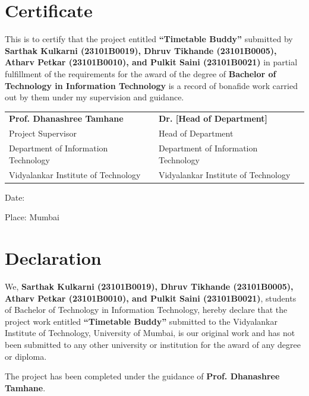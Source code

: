 \documentclass[12pt,a4paper]{report}
\begin{document}
\chapter*{Certificate}
\thispagestyle{empty}

This is to certify that the project entitled \textbf{``Timetable Buddy''} submitted by \textbf{Sarthak Kulkarni (23101B0019), Dhruv Tikhande (23101B0005), Atharv Petkar (23101B0010), and Pulkit Saini (23101B0021)} in partial fulfillment of the requirements for the award of the degree of \textbf{Bachelor of Technology in Information Technology} is a record of bonafide work carried out by them under my supervision and guidance.

\vspace{2cm}

\noindent\begin{tabular}{@{}ll}
    \textbf{Prof. Dhanashree Tamhane} & \textbf{Dr. [Head of Department]} \\
    Project Supervisor & Head of Department \\
    Department of Information Technology & Department of Information Technology \\
    Vidyalankar Institute of Technology & Vidyalankar Institute of Technology \\
\end{tabular}

\vspace{2cm}

\noindent Date: \underline{\hspace{3cm}}

\noindent Place: Mumbai

\chapter*{Declaration}
\thispagestyle{empty}

We, \textbf{Sarthak Kulkarni (23101B0019), Dhruv Tikhande (23101B0005), Atharv Petkar (23101B0010), and Pulkit Saini (23101B0021)}, students of Bachelor of Technology in Information Technology, hereby declare that the project work entitled \textbf{``Timetable Buddy''} submitted to the Vidyalankar Institute of Technology, University of Mumbai, is our original work and has not been submitted to any other university or institution for the award of any degree or diploma.

The project has been completed under the guidance of \textbf{Prof. Dhanashree Tamhane}.
\end{document}
